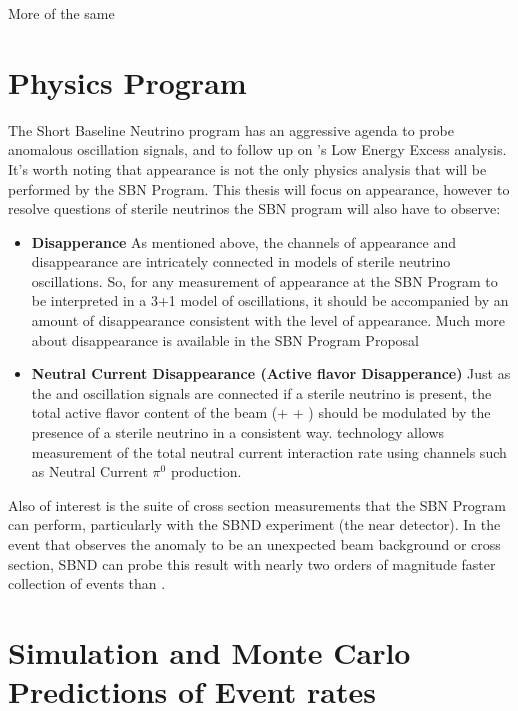 More of the same

\section{Physics Program}

The Short Baseline Neutrino program has an aggressive agenda to probe anomalous oscillation signals, and to follow up on \uboone's Low Energy Excess analysis.  It's worth noting that \nue appearance is not the only physics analysis that will be performed by the SBN Program.  This thesis will focus on \nue appearance, however to resolve questions of sterile neutrinos the SBN program will also have to observe:

\begin{itemize}

\item {\bf \numu Disapperance}  As mentioned above, the channels of \nue appearance and \numu disappearance are intricately connected in models of sterile neutrino oscillations.  So, for any measurement of \nue appearance at the SBN Program to be interpreted in a 3+1 model of oscillations, it should be accompanied by an amount of \numu disappearance consistent with the level of \nue appearance.  Much more about \numu disappearance is available in the SBN Program Proposal \cite{Antonello:2015lea} 

\item {\bf Neutral Current Disappearance (Active flavor Disapperance)}  Just as the \nue and \numu oscillation signals are connected if a sterile neutrino is present, the total active flavor content of the beam (\nue + \numu + \nutau) should be modulated by the presence of a sterile neutrino in a consistent way.  \lartpc technology allows measurement of the total neutral current interaction rate using channels such as Neutral Current $\pi^0$ production.

\end{itemize}

Also of interest is the suite of cross section measurements that the SBN Program can perform, particularly with the SBND experiment (the near detector).  In the event that \uboone observes the \MB anomaly to be an unexpected beam background or cross section, SBND can probe this result with nearly two orders of magnitude faster collection of events than \uboone.

\section{Simulation and Monte Carlo Predictions of Event rates}

